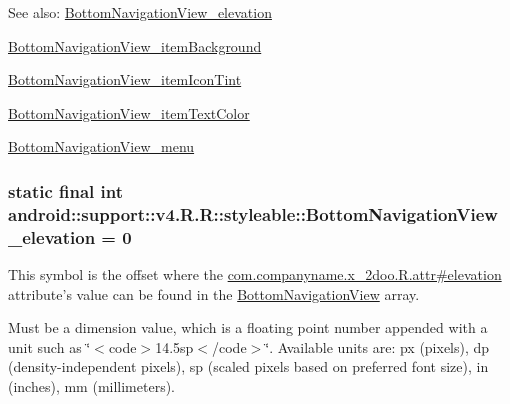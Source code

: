 \begin{Desc}
\item[See also:]\hyperlink{classandroid_1_1support_1_1v4_1_1_r_1_1styleable_fa96e594c72f2eba30a1c5154a95b87e}{BottomNavigationView\_\-elevation} 

\hyperlink{classandroid_1_1support_1_1v4_1_1_r_1_1styleable_330b02e19c11aae9367f4261f0e3d83e}{BottomNavigationView\_\-itemBackground} 

\hyperlink{classandroid_1_1support_1_1v4_1_1_r_1_1styleable_79d29538f6e5b9f23314f6cfa696688f}{BottomNavigationView\_\-itemIconTint} 

\hyperlink{classandroid_1_1support_1_1v4_1_1_r_1_1styleable_587ccbdac026a0e313be585abff19ab0}{BottomNavigationView\_\-itemTextColor} 

\hyperlink{classandroid_1_1support_1_1v4_1_1_r_1_1styleable_b466b14ca9f60097882bb309cd4e7d6f}{BottomNavigationView\_\-menu} \end{Desc}
\hypertarget{classandroid_1_1support_1_1v4_1_1_r_1_1styleable_fa96e594c72f2eba30a1c5154a95b87e}{
\subsubsection[{BottomNavigationView\_\-elevation}]{\setlength{\rightskip}{0pt plus 5cm}static final int android::support::v4.R.R::styleable::BottomNavigationView\_\-elevation = 0}}
\label{classandroid_1_1support_1_1v4_1_1_r_1_1styleable_fa96e594c72f2eba30a1c5154a95b87e}


This symbol is the offset where the \hyperlink{classcom_1_1companyname_1_1x__2doo_1_1_r_1_1attr_3661b6445a2b19a2dca2157df91648d2}{com.companyname.x\_\-2doo.R.attr\#elevation} attribute's value can be found in the \hyperlink{classandroid_1_1support_1_1v4_1_1_r_1_1styleable_731fa193e6e8634aff724fecf9d4f640}{BottomNavigationView} array.

Must be a dimension value, which is a floating point number appended with a unit such as \char`\"{}$<$code$>$14.5sp$<$/code$>$\char`\"{}. Available units are: px (pixels), dp (density-independent pixels), sp (scaled pixels based on preferred font size), in (inches), mm (millimeters). 

